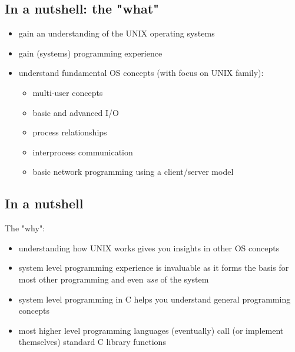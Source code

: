 \documentclass[sxga]{xdvislides}
\begin{document}
\subsection{In a nutshell: the "what"}
\begin{itemize}
	\item gain an understanding of the UNIX operating systems
	\item gain (systems) programming experience
	\item understand fundamental OS concepts (with focus on UNIX family):
		\begin{itemize}
			\item multi-user concepts
			\item basic and advanced I/O
			\item process relationships
			\item interprocess communication
			\item basic network programming using a client/server model
		\end{itemize}
\end{itemize}

\subsection{In a nutshell}
The "why":
\begin{itemize}
	\item understanding how UNIX works gives you insights in other OS concepts
	\item system level programming experience is invaluable as it
		forms the basis for most other programming and even {\em
		use} of the system
	\item system level programming in C helps you understand general
		programming concepts
	\item most higher level programming languages (eventually) call
		(or implement themselves) standard C library functions
\end{itemize}
\end{document}

